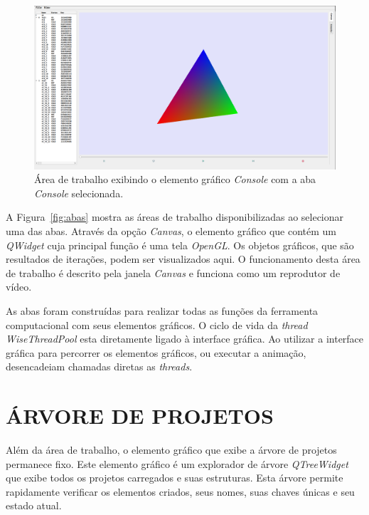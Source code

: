 \begin{figure}
	\centering
	\includegraphics[width=.9\linewidth]{Figures/IGU_001.png}
	\caption{Área de trabalho exibindo o elemento gráfico \textit{Console} com a aba \textit{Console} selecionada.}
	\label{fig:sfig2}
\end{figure}

A Figura~\ref{fig:abas} mostra as áreas de trabalho disponibilizadas ao selecionar uma das abas. Através da opção \textit{Canvas}, o elemento gráfico que contém um \textit{QWidget} cuja principal função é uma tela \textit{OpenGL}. Os objetos gráficos, que são resultados de iterações, podem ser visualizados aqui. O funcionamento desta área de trabalho é descrito pela janela \textit{Canvas} e funciona como um 
reprodutor de vídeo.

As abas foram construídas para realizar todas as funções da ferramenta computacional com seus elementos gráficos. O ciclo de vida da \textit{thread} \textit{WiseThreadPool} esta diretamente ligado à interface gráfica. Ao utilizar a interface gráfica para percorrer os elementos gráficos, ou executar a animação, desencadeiam chamadas diretas as \textit{threads}.

\section{ÁRVORE DE PROJETOS}\label{sec:arvore_projetos}

Além da área de trabalho, o elemento gráfico que exibe a árvore de projetos permanece fixo. Este elemento gráfico é um explorador de árvore \textit{QTreeWidget} que exibe todos os projetos carregados e suas estruturas. Esta árvore permite rapidamente verificar os elementos criados, seus nomes, suas chaves únicas e seu estado atual.

